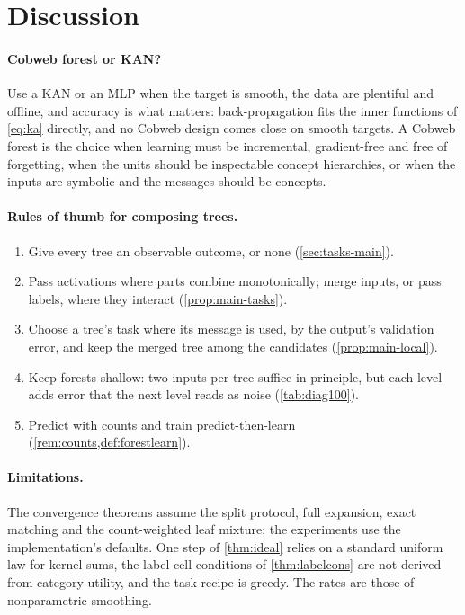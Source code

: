 \documentclass[11pt]{article}
\theoremstyle{definition}
\theoremstyle{remark}
\begin{document}
\section{Discussion}\label{sec:discussion}

\paragraph{Cobweb forest or KAN?}
Use a KAN or an MLP when the target is smooth, the data are plentiful and offline, and
accuracy is what matters: back-propagation fits the inner functions of \eqref{eq:ka}
directly, and no Cobweb design comes close on smooth targets.  A Cobweb forest is the
choice when learning must be incremental, gradient-free and free of forgetting, when the
units should be inspectable concept hierarchies, or when the inputs are symbolic and the
messages should be concepts.

\paragraph{Rules of thumb for composing trees.}
\begin{enumerate}[leftmargin=*,noitemsep]
\item Give every tree an observable outcome, or none (\cref{sec:tasks-main}).
\item Pass activations where parts combine monotonically; merge inputs, or pass labels,
  where they interact (\cref{prop:main-tasks}).
\item Choose a tree's task where its message is used, by the output's validation error,
  and keep the merged tree among the candidates (\cref{prop:main-local}).
\item Keep forests shallow: two inputs per tree suffice in principle, but each level adds
  error that the next level reads as noise (\cref{tab:diag100}).
\item Predict with counts and train predict-then-learn (\cref{rem:counts,def:forestlearn}).
\end{enumerate}

\paragraph{Limitations.}
The convergence theorems assume the split protocol, full expansion, exact matching and
the count-weighted leaf mixture; the experiments use the implementation's defaults.  One
step of \cref{thm:ideal} relies on a standard uniform law for kernel sums, the label-cell
conditions of \cref{thm:labelcons} are not derived from category utility, and the task
recipe is greedy.  The rates are those of nonparametric smoothing.
\end{document}
